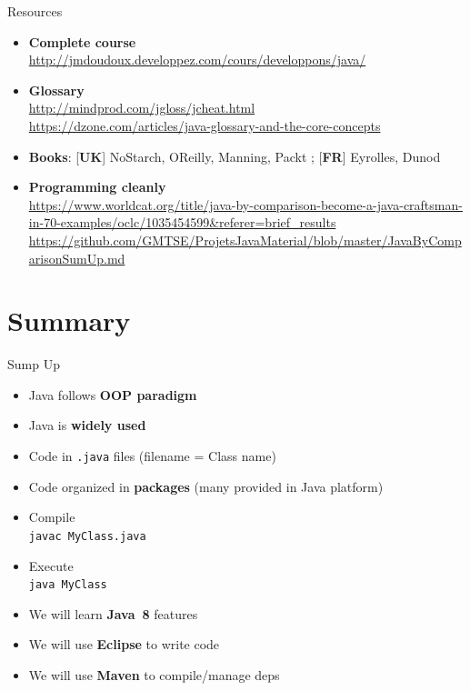 \documentclass[English,c,%
hyperref={%
    pdftitle={FISA-DE2 OOP in Java},%
    pdfauthor={Muller, Gravier, Laforest, Subercaze},%
    pdfsubject={OOP in Java},%
    pdfkeywords={OOP, Java},%
    colorlinks=true,%
    urlcolor=blue,%
    linkcolor=%
    },%
xcolor={pdftex,svgnames} %
]{beamer}
\begin{document}
\begin{frame}{Resources}
{\begin{itemize}
  \item \textbf{Complete course}\\
  \url{http://jmdoudoux.developpez.com/cours/developpons/java/}

  \item \textbf{Glossary}\\
  \url{http://mindprod.com/jgloss/jcheat.html}\\
  \url{https://dzone.com/articles/java-glossary-and-the-core-concepts}

  \item \textbf{Books}: [\textbf{UK}] NoStarch, OReilly, Manning, Packt ; [\textbf{FR}] Eyrolles, Dunod


  \item \textbf{Programming cleanly}\\
  \url{https://www.worldcat.org/title/java-by-comparison-become-a-java-craftsman-in-70-examples/oclc/1035454599&referer=brief_results} \\
  \url{https://github.com/GMTSE/ProjetsJavaMaterial/blob/master/JavaByComparisonSumUp.md}

\end{itemize}
}

\end{frame}



\section{Summary}
\begin{frame}{Sump Up}
  \begin{itemize}
    \item Java follows \textbf{OOP paradigm}
    \item Java is \textbf{widely used}
\medskip
    \item Code in \texttt{.java} files (filename = Class name)
    \item Code organized in \textbf{packages} (many provided in Java platform)
    \item Compile\\
    \texttt{javac MyClass.java}
    \item Execute\\
    \texttt{java MyClass}
\medskip
    \item We will learn \textbf{Java~8} features
    \item We will use \textbf{Eclipse} to write code
    \item We will use \textbf{Maven} to compile/manage deps
  \end{itemize}
\end{frame}
\end{document}

